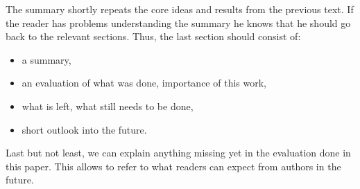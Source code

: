 \documentclass[twocolumn]{article}
\begin{document}
The summary shortly repeats the core ideas and results from the
previous text. If the reader has problems understanding the summary
he knows that he should go back to the relevant sections.
Thus, the last section should consist of:

\begin{itemize}
	\item a summary,
	\item an evaluation of what was done, importance of this work,
	\item what is left, what still needs to be done,
        \item short outlook into the future.
\end{itemize}

Last but not least, we can explain anything missing yet in the evaluation
done in this paper. This allows to refer to what readers can expect from
authors in the future.

\nocite{robotron,
stonx,vice,650sim,herculessim,zib,4004,thermal1,thermal2,rojas,neumann,
neumann1void,neumann2void,neumann3,neumann4,Siewiorek,AmBlBr,Blaauw:1997:CAC,ChPB97,Brom98,Clym93,Buhu99,
Edwa01,Nill99,ABC+90,Rama91,Heid97,Kist95,Klot03,LMcCL92,LFS+92,LMDD92,Vlec03,Cray77,top500,650,Amda67,
Arla88,ODLD86,Hick04,Walk04}



 
\end{document}
